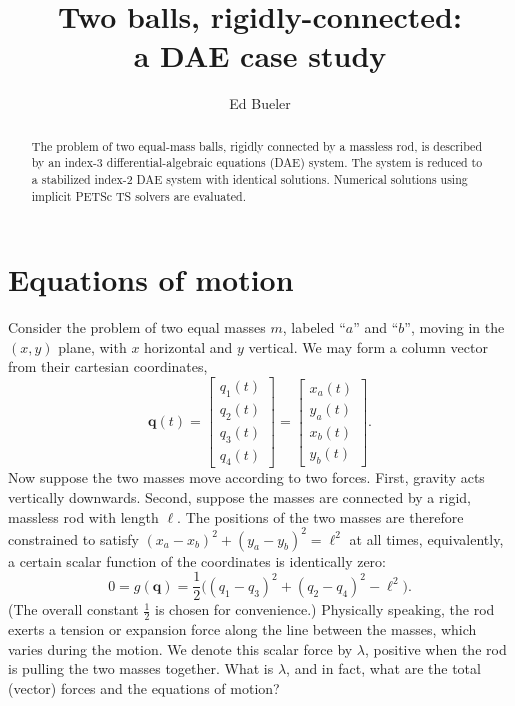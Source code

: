 \documentclass[letterpaper,final,12pt,reqno]{amsart}
\newcommand{\bq}{\mathbf{q}}
\begin{document}
\title[Two balls, rigidly-connected]{Two balls, rigidly-connected: \\ a DAE case study}

\author{Ed Bueler}

\begin{abstract}
The problem of two equal-mass balls, rigidly connected by a massless rod, is described by an index-3 differential-algebraic equations (DAE) system.  The system is reduced to a stabilized index-2 DAE system with identical solutions.  Numerical solutions using implicit PETSc TS solvers are evaluated.
\end{abstract}

\maketitle


\thispagestyle{empty}
\bigskip

\section{Equations of motion}

Consider the problem of two equal masses $m$, labeled ``$a$'' and ``$b$'', moving in the $(x,y)$ plane, with $x$ horizontal and $y$ vertical.  We may form a column vector from their cartesian coordinates,
\begin{equation}
\bq(t) = \begin{bmatrix} q_1(t) \\ q_2(t) \\ q_3(t) \\ q_4(t) \end{bmatrix} = \begin{bmatrix} x_a(t) \\ y_a(t) \\ x_b(t) \\ y_b(t) \end{bmatrix}. \label{position}
\end{equation}
Now suppose the two masses move according to two forces.  First, gravity acts vertically downwards.  Second, suppose the masses are connected by a rigid, massless rod with length $\ell$.  The positions of the two masses are therefore constrained to satisfy $(x_a - x_b)^2 + (y_a - y_b)^2 = \ell^2$ at all times, equivalently, a certain scalar function of the coordinates is identically zero:
\begin{equation}
0 = g(\bq) = \frac{1}{2} \Big((q_1 - q_3)^2 + (q_2 - q_4)^2 - \ell^2\Big). \label{constraint}
\end{equation}
(The overall constant $\frac{1}{2}$ is chosen for convenience.)  Physically speaking, the rod exerts a tension or expansion force along the line between the masses, which varies during the motion.  We denote this scalar force by $\lambda$, positive when the rod is pulling the two masses together.  What is $\lambda$, and in fact, what are the total (vector) forces and the equations of motion?
\end{document}
